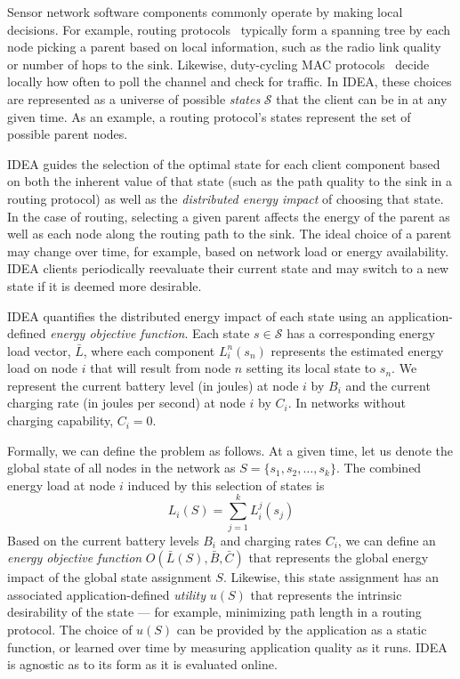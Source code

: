 Sensor network software components commonly operate by making local
decisions. For example, routing protocols~\cite{ctp,awoo-multihop} typically
form a spanning tree by each node picking a parent based on local
information, such as the radio link quality or number of hops to the sink.
Likewise, duty-cycling MAC protocols~\cite{bmac-sensys04} decide locally how
often to poll the channel and check for traffic. In IDEA, these choices are
represented as a universe of possible \textit{states} $\mathcal{S}$ that the
client can be in at any given time. As an example, a routing protocol's
states represent the set of possible parent nodes.

IDEA guides the selection of the optimal state for each client component
based on both the inherent value of that state (such as the path quality to
the sink in a routing protocol) as well as the \textit{distributed energy
impact} of choosing that state. In the case of routing, selecting a given
parent affects the energy of the parent as well as each node along the
routing path to the sink. The ideal choice of a parent may change over time,
for example, based on network load or energy availability. IDEA clients
periodically reevaluate their current state and may switch to a new state if
it is deemed more desirable.

IDEA quantifies the distributed energy impact of each state using an
application-defined \textit{energy objective function}. Each state $s \in
\mathcal{S}$ has a corresponding energy load vector, $\bar{L}$, where each
component $L_i^n(s_n)$ represents the estimated energy load on node $i$ that
will result from node $n$ setting its local state to $s_n$. We represent the
current battery level (in joules) at node $i$ by $B_i$ and the current
charging rate (in joules per second) at node $i$ by $C_i$. In networks
without charging capability, $C_i = 0$.

Formally, we can define the problem as follows. At a given time, let us
denote the global state of all nodes in the network as $S = \{ s_1, s_2,
\ldots, s_k \}$. The combined energy load at node $i$ induced by this
selection of states is \[ L_i(S) = \sum_{j=1}^k L_i^j(s_j) \] Based on the
current battery levels $B_i$ and charging rates $C_i$, we can define an
\textit{energy objective function} $O(\bar{L}(S), \bar{B}, \bar{C})$ that
represents the global energy impact of the global state assignment $S$.
Likewise, this state assignment has an associated application-defined
\textit{utility} $u(S)$ that represents the intrinsic desirability of the
state --- for example, minimizing path length in a routing protocol. The
choice of $u(S)$ can be provided by the application as a static function, or
learned over time by measuring application quality as it runs. IDEA is
agnostic as to its form as it is evaluated online.

